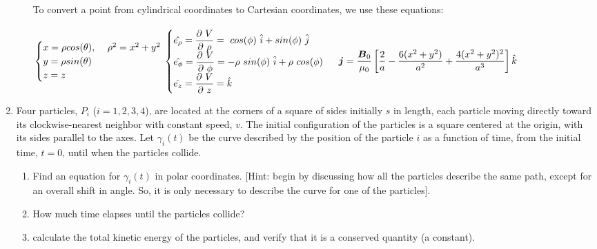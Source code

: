 \documentclass[fleqn]{article}
\newcommand{\vectr}[1]{\mbox{\boldmath{${#1}$}}}
\begin{document}
\begin{enumerate}
\begin{enumerate}
            \textcolor{hwColor}{
              To convert a point from cylindrical coordinates to Cartesian coordinates, we use these equations: \\
              \\
              $
                \begin{cases}
                  x=\rho cos(\theta), ~ & \rho^2=x^2+y^2 \\
                  y=\rho sin(\theta) \\
                  z=z
                \end{cases} \\
                \\
                \begin{cases}
                  \hat{e_{\rho}}=\dfrac{\partial V}{\partial \rho}= cos(\phi) \hat{i}+sin(\phi) \hat{j}  \\
                  \hat{e_{\phi}}=\dfrac{\partial V}{\partial \phi}=-\rho sin(\phi) \hat{i}+\rho cos(\phi)  \\
                  \hat{e_z}=\dfrac{\partial V}{\partial z}=\hat{k}
                \end{cases} \\ \\
                \vectr{j}=\dfrac{\vectr{B}_0}{\mu_0} \left[\dfrac{2}{a}-\dfrac{6 (x^2+y^2)}{a^2}+\dfrac{4 (x^2+y^2)^2}{a^3}\right]\hat{k}
              $
            }
      
        \end{enumerate}
    
    
    \item  Four particles, $P_i$ ($i=1,2,3,4$), are located at the corners of a square of sides initially $s$ in length, each particle moving directly toward its
      clockwise-nearest neighbor with constant speed, $v.$  The initial configuration of the particles is a square centered at the origin, with its sides parallel to the axes. 
      Let $\gamma_i(t)$ be the curve described by the position of the particle $i$ as a function of time, from the initial time, $t=0$, until when the particles collide. 
        \begin{enumerate}
        \item Find an equation for $\gamma_i(t)$ in polar coordinates. [Hint: begin by discussing how all the particles describe the same path, except for an overall shift in angle. So, it is only necessary to describe the curve for one of the particles]. 
    
        \item How much time elapses until the particles collide?  
    
        \item calculate the total kinetic energy of the particles, and verify that it is a conserved quantity (a constant).  
        \end{enumerate}
    
  \end{enumerate}
\end{document}
